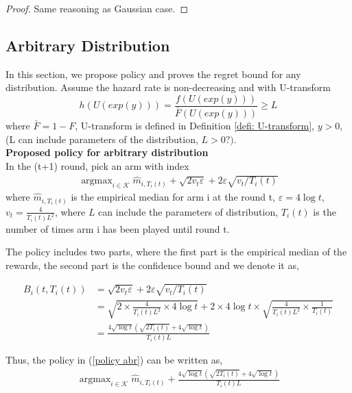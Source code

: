 \documentclass{article}
\DeclareMathOperator*{\argmax}{argmax}
\theoremstyle{plain}
\begin{document}
\begin{proof}
Same reasoning as Gaussian case. 
\end{proof}

\subsection{Arbitrary Distribution}

In this section, we propose policy and proves the regret bound for any distribution. Assume the hazard rate is non-decreasing and with U-transform
$$h\left(U(exp(y))\right) = \frac{f\left(U(exp(y))\right)}{\bar{F}\left(U(exp(y))\right) } \geq L$$
where $\bar{F} = 1 - F$, U-transform is defined in Definition \ref{defi: U-transform}, $y > 0$, (L can include parameters of the distribution, $L > 0 ?)$. \\

\textbf{Proposed policy for arbitrary distribution}\\

In the (t+1) round, pick an arm with index 
\begin{align}
   \label{policy abr}
   \argmax_{i \in \mathcal{K}} \hat{m}_{i, T_i(t)} + \sqrt{2v_t \varepsilon} + 2 \varepsilon \sqrt{v_t/T_i(t)}
\end{align}
where $\hat{m}_{i, T_i(t)}$ is the empirical median for arm i at the round t, $\varepsilon = 4 \log t$, $v_t = \frac{4 }{T_i(t) L^2}$, where $L$ can include the parameters of distribution, $T_i(t)$ is the number of times arm i has been played until round t.  

The policy includes two parts, where the first part is the empirical median of the rewards, the second part is the confidence bound and we denote it as,

\begin{align}
B_i(t, T_i(t)) &= \sqrt{2v_t \varepsilon} + 2 \varepsilon \sqrt{v_t/T_i(t)}\\
&= \sqrt{2 \times \frac{4 }{T_i(t) L^2} \times 4 \log t} + 2 \times 4 \log t \times \sqrt{\frac{4 }{T_i(t) L^2} \times \frac{1}{T_i(t)}}\\
&= \frac{4 \sqrt{\log t} ( \sqrt{ 2T_i(t)} + 4\sqrt{\log t})}{T_i(t) L}
\end{align}

Thus, the policy in (\ref{policy abr}) can be written as,
\begin{align}
    \argmax_{i \in \mathcal{K}} \hat{m}_{i, T_i(t)} +  \frac{4 \sqrt{\log t} ( \sqrt{ 2T_i(t)} + 4\sqrt{\log t})}{T_i(t) L}
\end{align}
\end{document}
